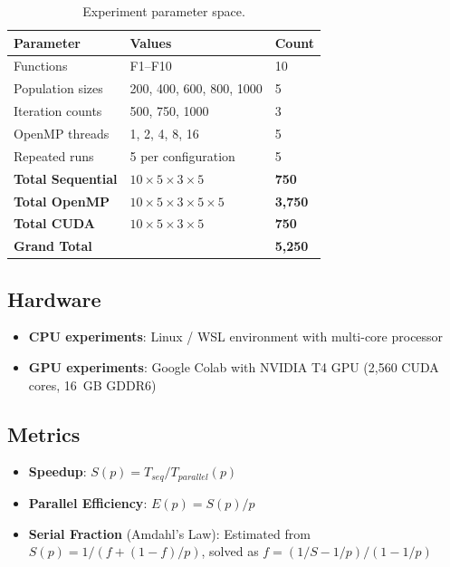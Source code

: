 \documentclass[12pt, a4paper]{article}
\begin{document}
\begin{table}[H]
\centering
\caption{Experiment parameter space.}
\label{tab:params}
\begin{tabular}{@{}lll@{}}
\toprule
\textbf{Parameter} & \textbf{Values} & \textbf{Count} \\
\midrule
Functions          & F1--F10                        & 10 \\
Population sizes   & 200, 400, 600, 800, 1000       & 5  \\
Iteration counts   & 500, 750, 1000                 & 3  \\
OpenMP threads     & 1, 2, 4, 8, 16                 & 5  \\
Repeated runs      & 5 per configuration            & 5  \\
\midrule
\textbf{Total Sequential} & $10 \times 5 \times 3 \times 5$ & \textbf{750} \\
\textbf{Total OpenMP}     & $10 \times 5 \times 3 \times 5 \times 5$ & \textbf{3,750} \\
\textbf{Total CUDA}       & $10 \times 5 \times 3 \times 5$ & \textbf{750} \\
\textbf{Grand Total}      &                                 & \textbf{5,250} \\
\bottomrule
\end{tabular}
\end{table}

\subsection{Hardware}

\begin{itemize}
    \item \textbf{CPU experiments}: Linux / WSL environment with multi-core processor
    \item \textbf{GPU experiments}: Google Colab with NVIDIA T4 GPU (2,560 CUDA cores, 16~GB GDDR6)
\end{itemize}

\subsection{Metrics}

\begin{itemize}
    \item \textbf{Speedup}: $S(p) = T_{seq} / T_{parallel}(p)$
    \item \textbf{Parallel Efficiency}: $E(p) = S(p) / p$
    \item \textbf{Serial Fraction} (Amdahl's Law): Estimated from $S(p) = 1 / (f + (1-f)/p)$, solved as $f = (1/S - 1/p) / (1 - 1/p)$
\end{itemize}
\end{document}
